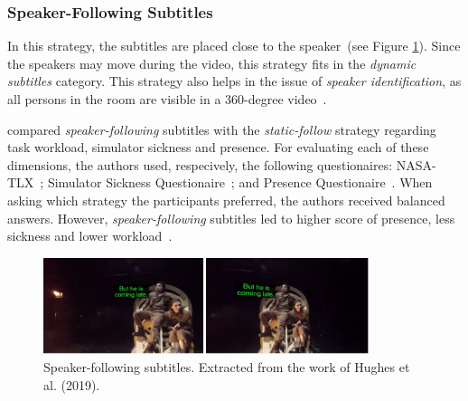 \subsubsection{Speaker-Following Subtitles}
\label{subsubsec:speaker_following}

In this strategy, the subtitles are placed close to the speaker~(see Figure \ref{fig:speaker_following}). Since the speakers may move during the video, this strategy fits in the \emph{dynamic subtitles} category. This strategy also helps in the issue of \emph{speaker identification}, as all persons in the room are visible in a 360-degree video~\cite{rothe_dynamic_2018}.  

 compared \emph{speaker-following} subtitles with the \emph{static-follow} strategy regarding task workload, simulator sickness and presence. For evaluating each of these dimensions, the authors used, respecively, the following questionaires: NASA-TLX~\cite{nasa_hart1988development}; Simulator Sickness Questionaire~\cite{sickness_kennedy1993simulator}; and Presence Questionaire~\cite{presence_witmer1998measuring}. When asking which strategy the participants preferred, the authors received balanced answers. However, \emph{speaker-following} subtitles led to higher score of presence, less sickness and lower workload~\cite{rothe_dynamic_2018}.

\begin{figure}[!ht]
    \centering
    \includegraphics[width=0.85\textwidth]{img/speaker-following.png}
    \caption{Speaker-following subtitles. Extracted from the work of Hughes et al. (2019).}
    \label{fig:speaker_following}
\end{figure}
